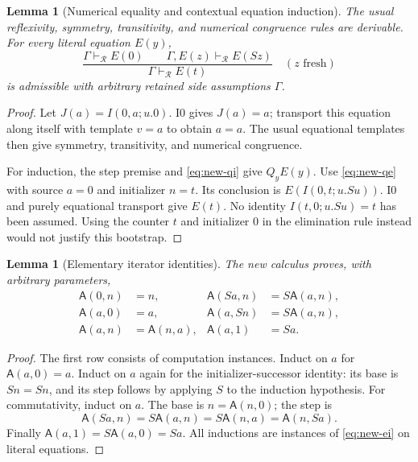 \documentclass[11pt,a4paper]{article}
\newtheorem{lemma}[theorem]{Lemma}
\theoremstyle{definition}\newtheorem{definition}[theorem]{Definition}
\begin{document}
\begin{lemma}[Numerical equality and contextual equation induction]
\label{lem:new-ei}
The usual reflexivity, symmetry, transitivity, and numerical congruence rules
are derivable.  For every literal equation $E(y)$,
\begin{equation}
 \frac{\Gamma\vdash_{\mathcal R}E(0)\qquad
       \Gamma,E(z)\vdash_{\mathcal R}E(Sz)}
      {\Gamma\vdash_{\mathcal R}E(t)}
 \quad(z\text{ fresh})
 \label{eq:new-ei}
\end{equation}
is admissible with arbitrary retained side assumptions $\Gamma$.
\end{lemma}
\begin{proof}
Let $J(a)=I(0,a;u.0)$.  I0 gives $J(a)=a$; transport this equation along
itself with template $v=a$ to obtain $a=a$.  The usual equational templates
then give symmetry, transitivity, and numerical congruence.

For induction, the step premise and \eqref{eq:new-qi} give $Q_yE(y)$.
Use \eqref{eq:new-qe} with source $a=0$ and initializer $n=t$.  Its conclusion
is $E(I(0,t;u.Su))$.  I0 and purely equational transport give $E(t)$.
No identity $I(t,0;u.Su)=t$ has been assumed.  Using the counter $t$ and
initializer $0$ in the elimination rule instead would not justify this
bootstrap.
\end{proof}

\begin{lemma}[Elementary iterator identities]
\label{lem:new-addition}
The new calculus proves, with arbitrary parameters,
\begin{equation}
 \begin{aligned}
 \mathsf A(0,n)&=n,&
 \mathsf A(Sa,n)&=S\mathsf A(a,n),\\
 \mathsf A(a,0)&=a,&
 \mathsf A(a,Sn)&=S\mathsf A(a,n),\\
 \mathsf A(a,n)&=\mathsf A(n,a),&
 \mathsf A(a,1)&=Sa.
 \end{aligned}
 \label{eq:new-add-identities}
\end{equation}
\end{lemma}
\begin{proof}
The first row consists of computation instances.  Induct on $a$ for
$\mathsf A(a,0)=a$.  Induct on $a$ again for the initializer-successor
identity: its base is $Sn=Sn$, and its step follows by applying $S$ to the
induction hypothesis.  For commutativity, induct on $a$.  The base is
$n=\mathsf A(n,0)$; the step is
\[
 \mathsf A(Sa,n)=S\mathsf A(a,n)
               =S\mathsf A(n,a)=\mathsf A(n,Sa).
\]
Finally $\mathsf A(a,1)=S\mathsf A(a,0)=Sa$.
All inductions are instances of \eqref{eq:new-ei} on literal equations.
\end{proof}
\end{document}
